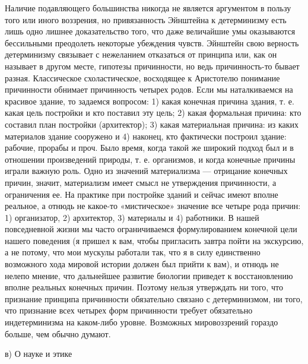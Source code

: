 Наличие подавляющего большинства никогда не является аргументом в пользу того
или иного воззрения, но привязанность Эйнштейна
к детерминизму есть лишь одно лишнее доказательство того, что даже величайшие
умы оказываются бессильными преодолеть некоторые убеждения чувств. Эйнштейн
свою верность детерминизму связывает с нежеланием отказаться от принципа или,
как он называет в другом месте, гипотезы причинности, но ведь причинность-то
бывает разная. Классическое схоластическое, восходящее к Аристотелю понимание
причинности обнимает причинность четырех родов. Если мы наталкиваемся на
красивое здание, то задаемся вопросом: 1) какая конечная причина здания, т. е.
какая цель постройки и кто поставил эту цель; 2) какая формальная причина: кто
составил план постройки (архитектор); 3) какая материальная причина: из каких
материалов здание сооружено и 4) наконец, кто фактически построил здание:
рабочие, прорабы и проч. Было время, когда такой же широкий подход был и в
отношении произведений природы, т. е. организмов, и когда конечные причины
играли важную роль. Одно из значений материализма --- отрицание конечных причин,
значит, материализм имеет смысл не утверждения причинности, а ограничения ее.
На практике при постройке зданий и сейчас имеют вполне реальное, а отнюдь не
какое-то «мистическое» значение все четыре рода причин: 1) организатор, 2)
архитектор, 3) материалы и 4) работники. В нашей повседневной жизни мы часто
ограничиваемся формулированием конечной цели нашего поведения (я пришел к вам,
чтобы пригласить завтра пойти на экскурсию, а не потому, что мои мускулы
работали так, что я в силу единственно возможного хода мировой истории должен
был прийти к вам), и отнюдь не нелепо мнение, что дальнейшее развитие биологии
приведет к восстановлению вполне реальных конечных причин. Поэтому нельзя
утверждать ни того, что признание принципа причинности обязательно связано с
детерминизмом, ни того, что признание всех четырех форм причинности требует
обязательно индетерминизма на каком-либо уровне. Возможных мировоззрений
гораздо больше, чем обычно думают.

в) О науке и этике

